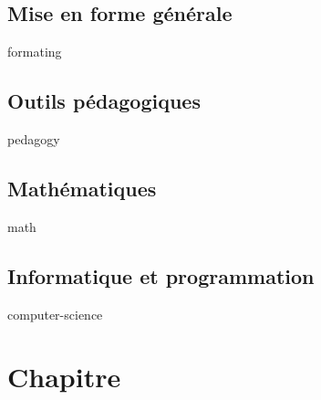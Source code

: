 \documentclass[14pt]{memoir}
\begin{document}
\section{Mise en forme générale}

{formating}



\section{Outils pédagogiques}

{pedagogy}



\section{Mathématiques}

{math}



\section{Informatique et programmation}

{computer-science}




\chapter{Chapitre}
\end{document}
